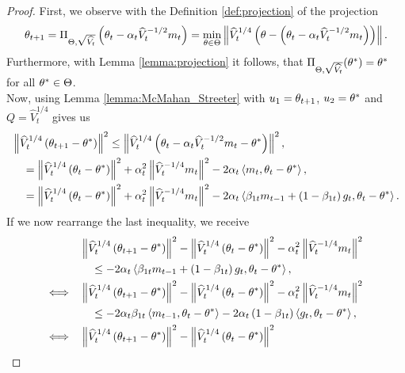 \begin{proof}
First, we observe with the Definition \ref{def:projection} of the projection
\begin{align*}
\theta_{t+1} = \Pi_{\operatorname{\Theta}, \sqrt{\widehat{V_t}}} \left(\theta_t - \alpha_t \widehat{V}_t^{-1/2}m_t \right) = \min_{\theta \in \operatorname{\Theta}} \left\|\widehat{V}_t^{1/4} \left( \theta -  \left(\theta_t - \alpha_t \widehat{V}_t^{-1/2}m_t \right) \right) \right\|.
\end{align*}
Furthermore, with Lemma \ref{lemma:projection} it follows, that $\Pi_{\operatorname{\Theta}, \sqrt{\widehat{V_t}}}(\theta^{\ast}) = \theta^{\ast}$ for all $\theta^{\ast}\in\operatorname{\Theta}$.\\
Now, using Lemma \ref{lemma:McMahan_Streeter} with $u_1 = \theta_{t+1}$, $u_2= \theta^{\ast}$ and $Q=\hat{V}_t^{1/4}$ gives us
\begin{align*}
&\left\| \widehat{V}_t^{1/4}\left(\theta_{t+1} - \theta^{\ast} \right) \right\|^2 \leq  \left\| \widehat{V}_t^{1/4} \left( \theta_t -\alpha_t\widehat{V}_t^{-1/2}m_t - \theta^{\ast}\right)\right\|^2,\\
&\quad = \left\| \widehat{V}_t^{1/4} \left( \theta_t - \theta^{\ast} \right) \right\|^2 + \alpha_t^2 \left\| \widehat{V}_t^{-1/4} m_t \right\|^2 - 2\alpha_t \left\langle m_t, \theta_t - \theta^{\ast} \right\rangle,\\
&\quad = \left\| \widehat{V}_t^{1/4} \left( \theta_t - \theta^{\ast} \right) \right\|^2 + \alpha_t^2 \left\| \widehat{V}_t^{-1/4} m_t \right\|^2 - 2\alpha_t \left\langle \beta_{1t}m_{t-1} + \left(1-\beta_{1t}\right)g_t, \theta_t - \theta^{\ast} \right\rangle.
\end{align*}
If we now rearrange the last inequality, we receive
\begin{align*}
&\left\| \hat{V}_t^{1/4}\left(\t_{t+1} - \t^{\ast} \right) \right\|^2 - \left\| \hat{V}_t^{1/4} \left( \t_t - \t^{\ast} \right) \right\|^2 - \a_t^2 \left\| \hat{V}_t^{-1/4} m_t \right\|^2\\
&\quad \leq - 2\a_t \left\langle \b_{1t}m_{t-1} +  \left(1-\b_{1t}\right)g_t, \t_t - \t^{\ast} \right\rangle,\nonumber\\
\Longleftrightarrow \quad &\left\| \hat{V}_t^{1/4}\left(\t_{t+1} - \t^{\ast} \right) \right\|^2 - \left\| \hat{V}_t^{1/4} \left( \t_t - \t^{\ast} \right) \right\|^2 - \a_t^2 \left\| \hat{V}_t^{-1/4} m_t \right\|^2\nonumber\\
&\quad\leq - 2\a_t\b_{1t} \left\langle m_{t-1}, \t_t - \t^{\ast} \right\rangle - 2\a_t\left(1-\b_{1t}\right) \left\langle g_t, \t_t - \t^{\ast} \right\rangle,\nonumber\\
\Longleftrightarrow \quad &\left\| \hat{V}_t^{1/4}\left(\t_{t+1} - \t^{\ast} \right) \right\|^2 - \left\| \hat{V}_t^{1/4} \left( \t_t - \t^{\ast} \right) \right\|^2

\end{align*}
\end{proof}
